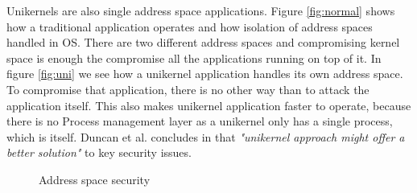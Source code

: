 Unikernels are also single address space applications. Figure \ref{fig:normal} shows how a traditional application operates and how isolation of address spaces handled in OS. There are two different address spaces and compromising kernel space is enough the compromise all the applications running on top of it. In figure \ref{fig:uni} we see how a unikernel application handles its own address space. To compromise that application, there is no other way than to attack the application itself. This also makes unikernel application faster to operate, because there is no Process management layer as a unikernel only has a single process, which is itself. Duncan et al. concludes in \cite{Duncan2017} that \textit{"unikernel approach might offer a better solution"} to key security issues.
\begin{figure}[htbp]
    \centering
    \hfill
    \caption{Address space security}\label{fig:single-space}
  \end{figure}

